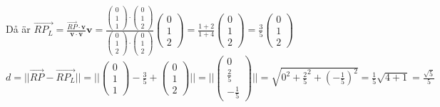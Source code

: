 Då är $\overrightarrow{RP_{L}}=\frac{\overrightarrow{RP}\cdot \bm{v}}{\bm{v}\cdot \bm{v}}\bm{v}=\frac{
    \begin{pmatrix}
        0\\1\\1
    \end{pmatrix}\cdot
    \begin{pmatrix}
        0\\1\\2
    \end{pmatrix}
}{
    \begin{pmatrix}
        0\\1\\2
    \end{pmatrix}\cdot
    \begin{pmatrix}
        0\\1\\2
    \end{pmatrix}
}\begin{pmatrix}
    0\\1\\2
\end{pmatrix}=\frac{1+2}{1+4}\begin{pmatrix}0\\1\\2\end{pmatrix}=\frac{3}{5}\begin{pmatrix}0\\1\\2\end{pmatrix}$
$d=||\overrightarrow{RP}-\overrightarrow{RP_{L}}||=||\begin{pmatrix}
    0\\1\\1
\end{pmatrix}-\frac{3}{5}+\begin{pmatrix}
    0\\1\\2
\end{pmatrix}||=||\begin{pmatrix}
    0\\\frac{2}{5}\\-\frac{1}{5}
\end{pmatrix}||=\sqrt{0^{2}+\frac{2}{5}^{2}+(-\frac{1}{5})^{2}}=\frac{1}{5}\sqrt{4+1}=\frac{\sqrt{5}}{5}$

